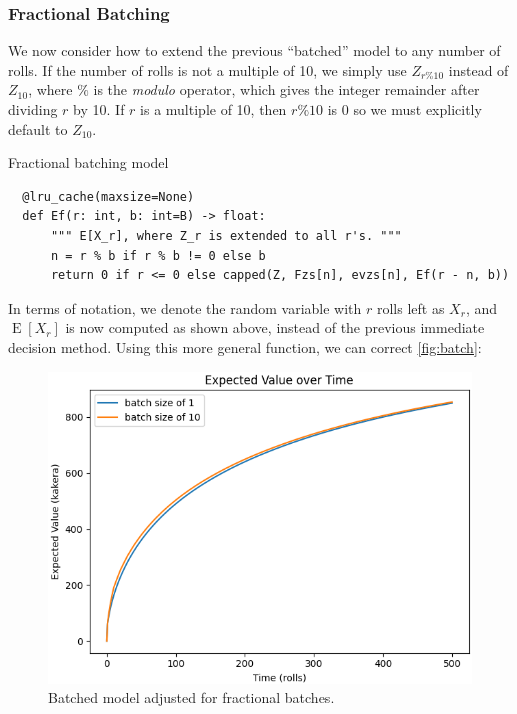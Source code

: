 \documentclass[11pt, oneside]{article}
\DeclareMathOperator{\E}{E}
\theoremstyle{plain}
\theoremstyle{definition}
\begin{document}
\subsubsection{Fractional Batching}
We now consider how to extend the previous \enquote{batched} model to any
number of rolls. If the number of rolls is not a multiple of 10, we simply use
\( Z_{r \% 10} \) instead of \( Z_{10} \), where \( \% \) is the 
\textit{modulo} operator, which gives the integer remainder
after dividing \( r \) by 10. If \( r \) is a multiple of 10,
then \( r \% 10 \) is 0 so we must explicitly default to \( Z_{10} \). 
\begin{algorithm}[H]
  \caption{Fractional batching model}
  \setlength{\partopsep}{-\topsep} %
  \begin{verbatim}
  @lru_cache(maxsize=None)
  def Ef(r: int, b: int=B) -> float:
      """ E[X_r], where Z_r is extended to all r's. """
      n = r % b if r % b != 0 else b
      return 0 if r <= 0 else capped(Z, Fzs[n], evzs[n], Ef(r - n, b))
  \end{verbatim}
\end{algorithm}

In terms of notation, we denote the random variable with \( r \) rolls left
as \( X_r \), and \( \E[X_r] \) is now computed as shown above, instead of
the previous immediate decision method. Using this more general function, we
can correct \autoref{fig:batch}:
\begin{figure}[h!]
  \centering
  \includegraphics[scale=0.6]{graphs/expected_value/model_10f.png}
  \caption{Batched model adjusted for fractional batches.}
\end{figure}
\end{document}
